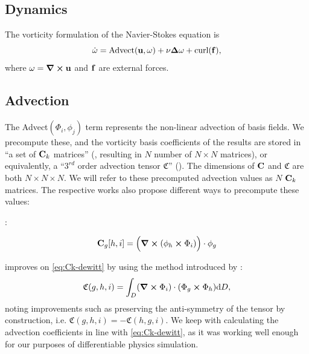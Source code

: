 
\subsection*{Dynamics}


The vorticity formulation of the Navier-Stokes equation is
\begin{equation}\label{eq:NSE-vorticity}
    \dot{\bf{\omega}} = \text{Advect}(\bf{u}, \bf{\omega}) + \nu \Delta\bf{\omega}
    + \text{curl}(\bf{f}),
\end{equation}
where $\bf{\omega} = \curl{\bf{u}}$ and $\bf{f}$ are external forces.

\subsection*{Advection}
The Advect$(\Phi_i, \phi_j)$ term represents the non-linear advection of basis
fields. We precompute these, and the vorticity basis coefficients of the results
are stored in ``a set of $\vb{C}_k$ matrices'' (\cite{dewitt}, resulting in $N$
number of $N \times N$ matrices), or equivalently, a ``$3^{rd}$ order advection
tensor $\mathfrak{C}$'' (\cite{scalable-eigenfluids}).  The dimensions of
$\vb{C}$ and $\mathfrak{C}$ are both $N \times N \times N$. We will refer to
these precomputed advection values as $N$ $\vb{C}_k$ matrices.
The respective works also propose different ways to precompute these values:

\cite{dewitt}:

\begin{equation}\label{eq:Ck-dewitt}
\vb{C}_g[h, i] = \Big( \curl(\phi_h \cross \Phi_i)\Big)\cdot \phi_g
\end{equation}

\cite{scalable-eigenfluids} improves on \eqref{eq:Ck-dewitt} by using the method
introduced by \cite{ModelReductionFluidSim}:
\begin{equation}
    \mathfrak{C}(g,h,i) = \int_D (\curl{\Phi_i})\cdot (\Phi_g \cross \Phi_h)
    \text{d}D,
\end{equation}
noting improvements such as preserving the anti-symmetry of the tensor by
construction, i.e. $\mathfrak{C}(g,h,i) = -\mathfrak{C}(h,g,i)$. We keep with
calculating the advection coefficients in line with \eqref{eq:Ck-dewitt}, as it
was working well enough for our purposes of differentiable physics simulation.

